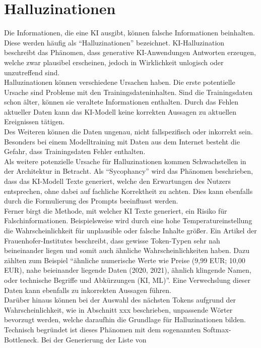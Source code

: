 \documentclass[../main.tex]{subfiles}
\begin{document}
\section{Halluzinationen}

Die Informationen, die eine KI ausgibt, können falsche Informationen beinhalten. Diese werden häufig als "`Halluzinationen"' bezeichnet. KI-Halluzination beschreibt 
das Phänomen, dass generative KI-Anwendungen Antworten erzeugen, welche zwar plausibel erscheinen, jedoch in Wirklichkeit unlogisch oder unzutreffend sind\cite{hallucinationForewarning}.\\
Halluzinationen können verschiedene Ursachen haben. Die erste potentielle Ursache sind Probleme mit den Trainingsdateninhalten. Sind die Trainingsdaten schon älter,
können sie veraltete Informationen enthalten. Durch das Fehlen aktueller Daten kann das KI-Modell keine korrekten Aussagen zu aktuellen Ereignissen tätigen.\\ Des 
Weiteren können die Daten ungenau, nicht fallspezifisch oder inkorrekt sein. Besonders bei einem Modelltraining mit Daten aus dem Internet besteht die Gefahr, dass 
Trainingsdaten Fehler enthalten.\\ Als weitere potenzielle Ursache für Halluzinationen kommen Schwachstellen in der Architektur in Betracht. Als "`Sycophancy"' wird das 
Phänomen beschrieben, dass das KI-Modell Texte generiert, welche den Erwartungen des Nutzers entsprechen, ohne dabei auf fachliche Korrektheit zu achten. Dies kann ebenfalls 
durch die Formulierung des Prompts beeinflusst werden.\cite{allgemHalluzinationen} \\
Ferner birgt die Methode, mit welcher KI Texte generiert, ein Risiko für Falschinformationen. Beispielsweise wird durch eine hohe Temperatureinstellung die 
Wahrscheinlichkeit für unplausible oder falsche Inhalte größer. Ein Artikel der Frauenhofer-Institutes beschreibt, dass gewisse Token-Typen sehr nah beineinander liegen 
und somit auch ähnliche Wahrscheinlichkeiten haben. Dazu zählten zum Beispiel "`ähnliche numerische Werte wie Preise (9,99 EUR; 10,00 EUR), nahe beieinander liegende 
Daten (2020, 2021), ähnlich klingende Namen, oder technische Begriffe und Abkürzungen (KI, ML)"'\cite{halluzinationenFraunhofer}. Eine Verwechslung dieser Daten kann ebenfalls zu inkorrekten Aussagen 
führen.\\
Darüber hinaus können bei der Auswahl des nächsten Tokens aufgrund der Wahrscheinlichkeit, wie in Abschnitt xxx beschrieben, unpassende Wörter bevorzugt werden, welche 
daraufhin die Grundlage für Halluzinationen bilden. Technisch begründet ist dieses Phänomen mit dem sogenannten Softmax-Bottleneck. Bei der Generierung der Liste von 
\end{document}
